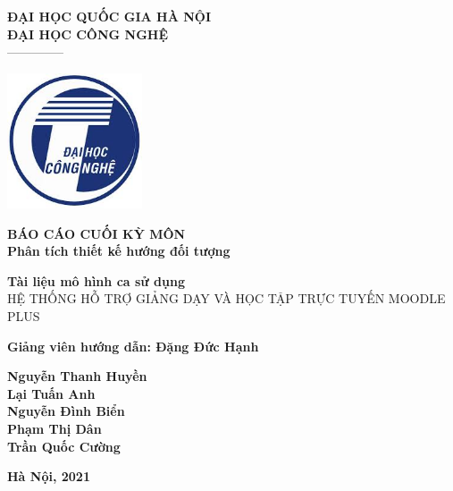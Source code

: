 \documentclass[./main.tex]{subfiles}
\begin{document}
\begin{titlepage}	
	\begin{center}
		\textbf{ĐẠI HỌC QUỐC GIA HÀ NỘI}\\
		\textbf{ĐẠI HỌC CÔNG NGHỆ}\\
		--------------
	
		\vspace*{30pt}
		
		\includegraphics[width=0.3\textwidth]{./images/uet.jpg}
		
		\vspace*{50pt}
		
		\textbf{BÁO CÁO CUỐI KỲ MÔN 
			\\ Phân tích thiết kế hướng đối tượng}
		\vspace*{30pt}
		
		\textbf{Tài liệu mô hình ca sử dụng\\}
		{\Large HỆ THỐNG HỖ TRỢ GIẢNG DẠY VÀ HỌC TẬP TRỰC TUYẾN MOODLE PLUS}
		
		\vspace*{50pt}
		
		\textbf{Giảng viên hướng dẫn: Đặng Đức Hạnh}
		
		\vspace*{30pt}
		
		\textbf{Nguyễn Thanh Huyền\\
			Lại Tuấn Anh\\
			Nguyễn Đình Biển\\
			Phạm Thị Dân\\
			Trần Quốc Cường\\
		}
		
		\vspace*{40pt}
	\end{center}
	
	
	\begin{center}
		\textbf{Hà Nội, 2021}
	\end{center}
\end{titlepage}
\end{document}
